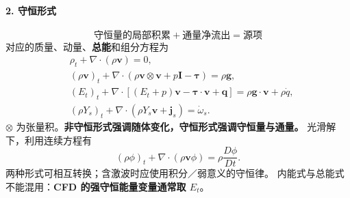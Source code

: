 \paragraph{2. 守恒形式}
\[
 \boxed{\text{守恒量的局部积累}+\text{通量净流出}=\text{源项}}
\]
对应的质量、动量、\textbf{总能}和组分方程为
\begin{align}
 &\rho_t+\nabla\cdot(\rho\mathbf v)=0,\\
 &(\rho\mathbf v)_t+\nabla\cdot
    (\rho\mathbf v\otimes\mathbf v+p\mathbf I-\boldsymbol\tau)=\rho\mathbf g,\\
 &(E_t)_t+\nabla\cdot
    [(E_t+p)\mathbf v-\boldsymbol\tau\cdot\mathbf v+\mathbf q]
    =\rho\mathbf g\cdot\mathbf v+\rho\dot q,\\
 &(\rho Y_s)_t+\nabla\cdot(\rho Y_s\mathbf v+\mathbf j_s)=\dot\omega_s.
 \label{eq:cfd-conservative-laws}
\end{align}
$\otimes$ 为张量积。\textbf{非守恒形式强调随体变化，守恒形式强调守恒量与通量。}
光滑解下，利用连续方程有
\[
 (\rho\phi)_t+\nabla\cdot(\rho\mathbf v\phi)=\rho\frac{D\phi}{Dt}.
\]
两种形式可相互转换；含激波时应使用积分／弱意义的守恒律。
内能式与总能式不能混用：\textbf{CFD 的强守恒能量变量通常取 $E_t$}。

